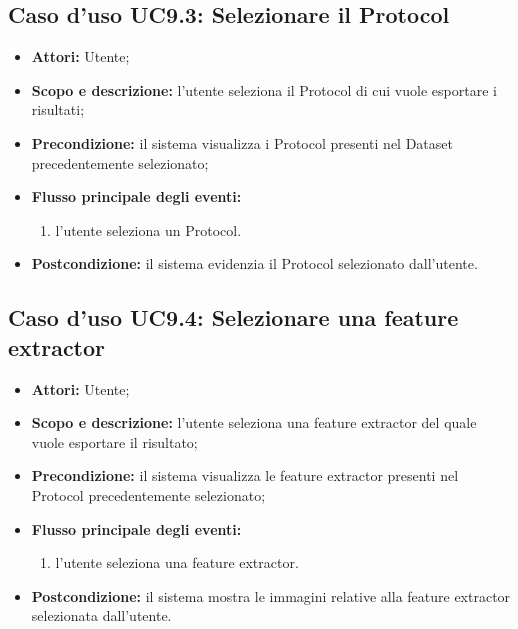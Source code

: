 \subsection{Caso d'uso UC9.3: Selezionare il Protocol}
\begin{itemize}
\item \textbf{Attori:} Utente;
\item \textbf{Scopo e descrizione:} l'utente seleziona il Protocol\glossario{} di cui vuole esportare i risultati;
\item \textbf{Precondizione:} il sistema visualizza i Protocol\glossario{} presenti nel Dataset\glossario{} precedentemente selezionato;
\item \textbf{Flusso principale degli eventi:}
\begin{enumerate}
\item l'utente seleziona un Protocol\glossario{}.
\end{enumerate}
\item \textbf{Postcondizione:} il sistema evidenzia il Protocol\glossario{} selezionato dall'utente.
\end{itemize}

\subsection{Caso d'uso UC9.4: Selezionare una feature extractor}
\begin{itemize}
\item \textbf{Attori:} Utente;
\item \textbf{Scopo e descrizione:} l'utente seleziona una feature extractor\glossario{} del quale vuole esportare il risultato;
\item \textbf{Precondizione:} il sistema visualizza le feature extractor\glossario{} presenti nel Protocol\glossario{} precedentemente selezionato;
\item \textbf{Flusso principale degli eventi:}
\begin{enumerate}
\item l'utente seleziona una feature extractor\glossario{}.
\end{enumerate}
\item \textbf{Postcondizione:} il sistema mostra le immagini relative alla feature extractor\glossario{} selezionata dall'utente.
\end{itemize}

